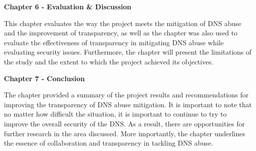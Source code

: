 \textbf{Chapter 6 -  Evaluation \& Discussion }

This chapter evaluates the way the project meets the mitigation of DNS abuse and the improvement of transparency, as well as the chapter was also used to evaluate the effectiveness of transparency in mitigating DNS abuse while evaluating security issues. Furthermore, the chapter will present the limitations of the study and the extent to which the project achieved its objectives.

\textbf{Chapter 7 -  Conclusion }

The chapter provided a summary of the project results and recommendations for improving the transparency of DNS abuse mitigation. It is important to note that no matter how difficult the situation, it is important to continue to try to improve the overall security of the DNS. As a result, there are opportunities for further research in the area discussed. More importantly, the chapter underlines the essence of collaboration and transparency in tackling DNS abuse.
